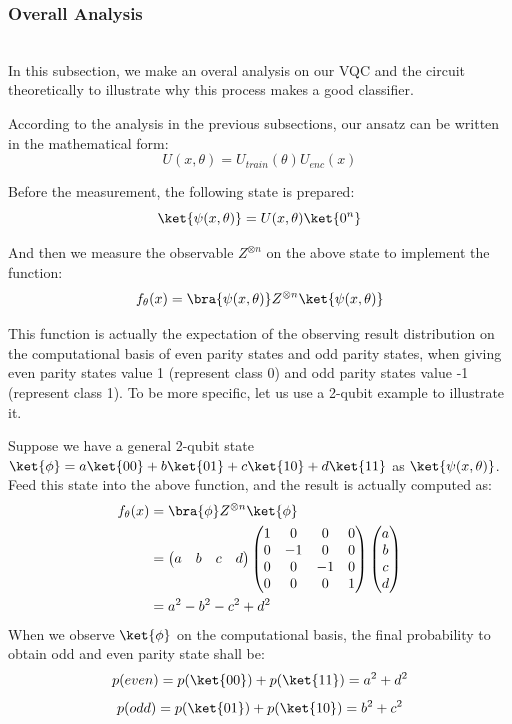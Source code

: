 \documentclass[sigconf]{acmart}
\begin{document}
\subsubsection{Overall Analysis}\hfill\\
In this subsection, we make an overal analysis on our VQC and the circuit theoretically to illustrate why this process makes a good classifier.

According to the analysis in the previous subsections, our  ansatz can be written in the mathematical form:
$$U(x,\theta)=U_{train}(\theta)U_{enc}(x)$$

Before the measurement, the following state is prepared:
$$\ket{\psi(x,\theta)}=U(x,\theta)\ket{0^n}$$

And then we measure the observable $Z^{\otimes n}$ on the above state to implement the function:
$$f_\theta(x)=\bra{\psi(x,\theta)}Z^{\otimes n}\ket{\psi(x,\theta)}$$  

This function is actually the expectation of the observing result distribution on the computational basis of even parity states and odd parity states, when giving even parity states value 1 (represent class 0) and odd parity states value -1 (represent class 1). To be more specific, let us use a 2-qubit example to illustrate it.

Suppose we have a general 2-qubit state $\ket{\phi}=a\ket{00}+b\ket{01}+c\ket{10}+d\ket{11}$ as $\ket{\psi(x,\theta)}$. Feed this state into the above function, and the result is actually computed as:
\begin{align*}
	f_\theta(x)&=\bra{\phi}Z^{\otimes n}\ket{\phi}\\
	&=\begin{pmatrix}
		a & b & c & d
		\end{pmatrix}\begin{pmatrix}
		1 & 0 & 0 & 0 \\
		0 & -1 & 0 & 0 \\
		0 & 0 & -1 & 0 \\
		0 & 0 & 0 & 1 
	\end{pmatrix}\begin{pmatrix}
	a \\
	b \\
	c \\
	d 
	\end{pmatrix}\\
    &=a^2-b^2-c^2+d^2
\end{align*}
When we observe $\ket{\phi}$ on the computational basis, the final probability to obtain odd and even parity state shall be:
$$p(even)=p(\ket{00})+p(\ket{11})=a^2+d^2$$
$$p(odd)=p(\ket{01})+p(\ket{10})=b^2+c^2$$
\end{document}
